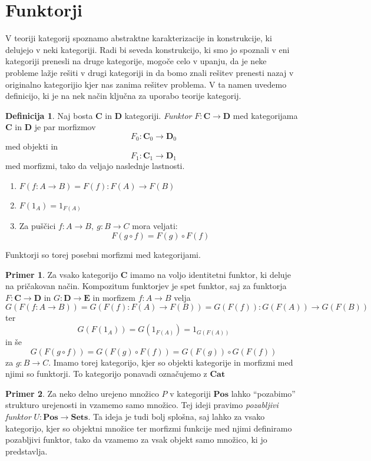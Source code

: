 \documentclass[12pt,a4paper]{book}
\theoremstyle{definition}
\newtheorem{definicija}{Definicija}[chapter]
\theoremstyle{plain}
\theoremstyle{definition}
\newtheorem{primer}{Primer}[section]
\theoremstyle{remark}
\newcommand{\cat}[1]{\textbf{#1}}
\begin{document}
\section{Funktorji}

V teoriji kategorij spoznamo abstraktne karakterizacije in konstrukcije, ki delujejo v neki kategoriji. Radi bi seveda konstrukcijo, ki smo jo spoznali v eni kategoriji prenesli na druge kategorije, mogoče celo v upanju, da je neke probleme lažje rešiti v drugi kategoriji in da bomo znali rešitev prenesti nazaj v originalno kategorijio kjer nas zanima rešitev problema. V ta namen uvedemo definicijo, ki je na nek način ključna za uporabo teorije kategorij.

\begin{definicija}
Naj bosta $\cat{C}$ in $\cat{D}$ kategoriji. \emph{Funktor} $F : \cat{C} \to \cat{D}$ med kategorijama $\cat{C}$ in $\cat{D}$ je par morfizmov
$$F_0 : \cat{C}_0 \to \cat{D}_0$$
med objekti in
$$F_1 : \cat{C}_1 \to \cat{D}_1$$
med morfizmi, tako da veljajo naslednje lastnosti.
\begin{enumerate}
\item $F(f : A \to B) = F(f) : F(A) \to F(B)$
\item $F(1_A) = 1_{F(A)}$
\item Za puščici $f : A \to B, \ g : B \to C$ mora veljati:
$$F(g \circ f) = F(g) \circ F(f)$$
\end{enumerate}
\end{definicija}

Funktorji so torej posebni morfizmi med kategorijami.

\begin{primer}
Za vsako kategorijo $\cat{C}$ imamo na voljo identitetni funktor, ki deluje na pričakovan način. Kompozitum funktorjev je spet funktor, saj za funktorja $F : \cat{C} \to \cat{D}$ in $G : \cat{D} \to \cat{E}$ in morfizem $f : A \to B$ velja
$$G(F(f : A \to B)) = G(F(f) : F(A) \to F(B)) = G(F(f)) : G(F(A)) \to G(F(B))$$
ter
$$G(F(1_A)) = G(1_{F(A)}) = 1_{G(F(A))}$$
in še
$$G(F(g \circ f)) = G(F(g) \circ F(f)) = G(F(g)) \circ G(F(f))$$
za $g : B \to C$. Imamo torej kategorijo, kjer so objekti kategorije in morfizmi med njimi so funktorji. To kategorijo ponavadi označujemo z $\cat{Cat}$ 
\end{primer}

\begin{primer}
Za neko delno urejeno množico $P$ v kategoriji $\cat{Pos}$ lahko "`pozabimo"' strukturo urejenosti in vzamemo samo množico. Tej ideji pravimo \emph{pozabljivi funktor} $U : \cat{Pos} \to \cat{Sets}$. Ta ideja je tudi bolj splošna, saj lahko za vsako kategorijo, kjer so objektni množice ter morfizmi funkcije med njimi definiramo pozabljivi funktor, tako da vzamemo za vsak objekt samo množico, ki jo predstavlja.
\end{primer}
\end{document}
